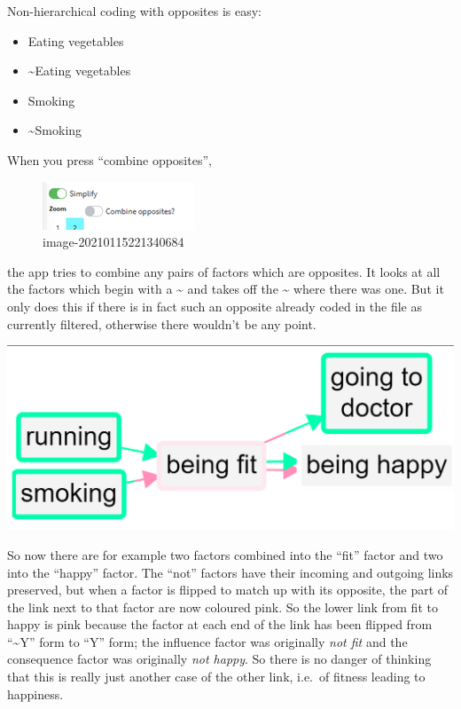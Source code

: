 \documentclass[
]{book}
\providecommand{\tightlist}{%
  \setlength{\itemsep}{0pt}\setlength{\parskip}{0pt}}
\begin{document}
Non-hierarchical coding with opposites is easy:

\begin{itemize}
\tightlist
\item
  Eating vegetables
\item
  \textasciitilde Eating vegetables
\item
  Smoking
\item
  \textasciitilde Smoking
\end{itemize}

When you press ``combine opposites'',

\begin{figure}
\centering
\includegraphics{_assets/image-20210115221340684.png}
\caption{image-20210115221340684}
\end{figure}

the app tries to combine any pairs of factors which are opposites. It looks at all the factors which begin with a \textasciitilde{} and takes off the \textasciitilde{} where there was one. But it only does this if there is in fact such an opposite already coded in the file as currently filtered, otherwise there wouldn't be any point.

\includegraphics{_assets/121008.png}

So now there are for example two factors combined into the ``fit'' factor and two into the ``happy'' factor. The ``not'' factors have their incoming and outgoing links preserved, but when a factor is flipped to match up with its opposite, the part of the link next to that factor are now coloured pink. So the lower link from fit to happy is pink because the factor at each end of the link has been flipped from ``\textasciitilde Y'' form to ``Y'' form; the influence factor was originally \emph{not fit} and the consequence factor was originally \emph{not happy}. So there is no danger of thinking that this is really just another case of the other link, i.e.~of fitness leading to happiness.
\end{document}
